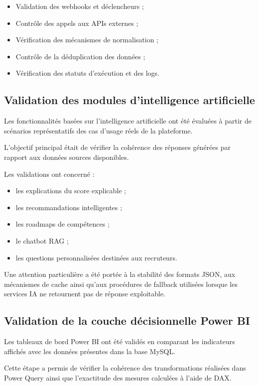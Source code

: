 \begin{itemize}
\item Validation des webhooks et déclencheurs ;
\item Contrôle des appels aux APIs externes ;
\item Vérification des mécanismes de normalisation ;
\item Contrôle de la déduplication des données ;
\item Vérification des statuts d'exécution et des logs.
\end{itemize}

\subsection{Validation des modules d'intelligence artificielle}

Les fonctionnalités basées sur l'intelligence artificielle ont été évaluées à partir de scénarios représentatifs des cas d'usage réels de la plateforme.

L'objectif principal était de vérifier la cohérence des réponses générées par rapport aux données sources disponibles.

Les validations ont concerné :

\begin{itemize}
\item les explications du score explicable ;
\item les recommandations intelligentes ;
\item les roadmaps de compétences ;
\item le chatbot RAG ;
\item les questions personnalisées destinées aux recruteurs.
\end{itemize}

Une attention particulière a été portée à la stabilité des formats JSON, aux mécanismes de cache ainsi qu'aux procédures de fallback utilisées lorsque les services IA ne retournent pas de réponse exploitable.

\subsection{Validation de la couche décisionnelle Power BI}

Les tableaux de bord Power BI ont été validés en comparant les indicateurs affichés avec les données présentes dans la base MySQL.

Cette étape a permis de vérifier la cohérence des transformations réalisées dans Power Query ainsi que l'exactitude des mesures calculées à l'aide de DAX.

